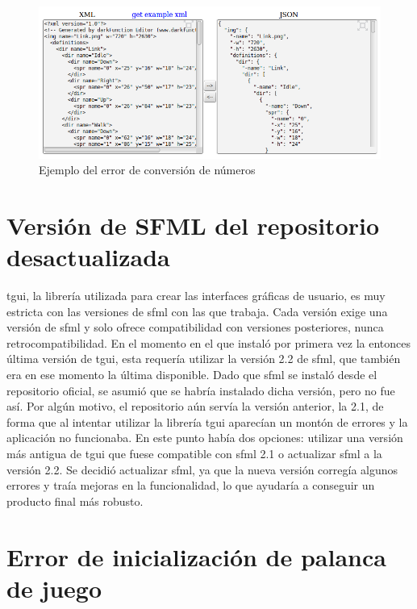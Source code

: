 	\begin{figure}[!htp]
		 \centering
		 \includegraphics[scale=.15]{fig/conversionNums}
		 \caption{Ejemplo del error de conversión de números}
		 \label{fig:conversionNums}
	\end{figure}

\section{Versión de SFML del repositorio desactualizada}

	\acrshort{tgui}, la librería utilizada para crear las interfaces gráficas de usuario, es muy estricta con las versiones de \acrshort{sfml} con las que trabaja. Cada versión exige una versión de \acrshort{sfml} y solo ofrece compatibilidad con versiones posteriores, nunca retrocompatibilidad. En el momento en el que instaló por primera vez la entonces última versión de \acrshort{tgui}, esta requería utilizar la versión 2.2 de \acrshort{sfml}, que también era en ese momento la última disponible. Dado que \acrshort{sfml} se instaló desde el repositorio oficial, se asumió que se habría instalado dicha versión, pero no fue así. Por algún motivo, el repositorio aún servía la versión anterior, la 2.1, de forma que al intentar utilizar la librería \acrshort{tgui} aparecían un montón de errores y la aplicación no funcionaba. En este punto había dos opciones: utilizar una versión más antigua de \acrshort{tgui} que fuese compatible con \acrshort{sfml} 2.1 o actualizar \acrshort{sfml} a la versión 2.2. Se decidió actualizar \acrshort{sfml}, ya que la nueva versión corregía algunos errores y traía mejoras en la funcionalidad, lo que ayudaría a conseguir un producto final más robusto.

\section{Error de inicialización de palanca de juego}

